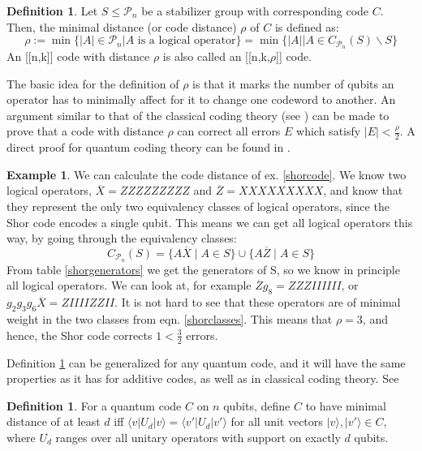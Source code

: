 \documentclass{article}
\def\P{\mathcal{P}}
\theoremstyle{definition}
\newtheorem{ex}[Satz]{Example}
\newtheorem{defn}[Satz]{Definition}
\begin{document}

\begin{defn}\label{defdist}
Let $S \leq \P_n$ be a stabilizer group with corresponding code $C$. Then, the minimal distance (or code distance) $\rho$ of $C$ is defined as:
\begin{equation} \rho := \min \{ |A| \in \P_n | A \text{ is a logical operator} \} = \min \{ |A| \mid A \in C_{\P_n}(S)\backslash S \} \end{equation}
An [[n,k]] code with distance $\rho$ is also called an [[n,k,$\rho$]] code.
\end{defn}



The basic idea for the definition of $\rho$ is that it marks the number of qubits an operator has to minimally affect for it to change one codeword to another. 
An argument similar to that of the classical coding theory (see \cite{classicalcodes}) can be made to prove that a code with distance $\rho$ can correct all errors $E$ which satisfy $|E| < \frac{\rho}{2}$. A direct proof for quantum coding theory can be found in \cite{leemhuis}.

\begin{ex}
We can calculate the code distance of ex.  \ref{shorcode}. We know two logical operators, $\overline X = ZZZZZZZZZ$ and $\overline Z = XXXXXXXXX$, and know that they represent the only two equivalency classes of logical operators, since the Shor code encodes a single qubit.
This means we can get all logical operators this way, by going through the equivalency classes: \begin{equation}\label{shorclasses} C_{\P_n}(S) = \{ A \overline X \mid A \in S \} \cup \{ A \overline Z \mid A \in S \} \end{equation} From table  \ref{shorgenerators} we get the generators of S, so we know in principle all logical operators.
We can look at, for example $ \overline Z g_8 = ZZZIIIIII$, or $g_2 g_3 g_6 \overline X = ZIIIIZZII$. It is not hard to see that these operators are of minimal weight in the two classes from eqn.  \ref{shorclasses}. This means that $\rho = 3$, and hence, 
the Shor code corrects $1 < \frac{3}{2}$ errors. 
\end{ex}

Definition \ref{defdist} can be generalized for any quantum code, and it will have the same properties as it has for additive codes, as well as in classical coding theory. See \cite{nebe}
\begin{defn}\label{distgeneral}
For a quantum code $C$ on $n$ qubits, define $C$ to have minimal distance of at least $d$ iff $\langle v | U_d | v \rangle = \langle v' | U_d | v' \rangle$ for all unit vectors $|v \rangle, |v' \rangle \in C$, where $U_d$ ranges over all unitary operators with support on exactly $d$ qubits.
\end{defn}
\end{document}

